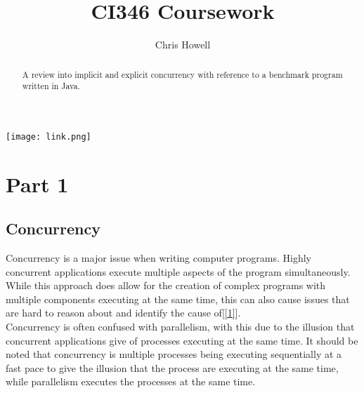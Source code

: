 \documentclass[11pt]{article}  %
\title{CI346 Coursework}
\author{Chris Howell\\}
\theoremstyle{definition}
\theoremstyle{remark}
\begin{document}
\maketitle
 \begin{center}
  \texttt{[image: link.png]}
  \end{center}
\newpage                     %
\begin{abstract}

A review into implicit and explicit concurrency with reference to a benchmark program written in Java.



\end{abstract}

\newpage                     %
\tableofcontents

\newpage                     %
\section{Part 1}\label{s:intro}
%


 \begin{center}
  \end{center}

\subsection{Concurrency}\label{ss:back}



Concurrency is a major issue when writing computer programs. Highly concurrent applications execute multiple aspects of the program simultaneously. While this approach does allow for the creation of complex programs with multiple components executing at the same time, this can also cause issues that are hard to reason about and identify the cause of[\ref{1}].\\

Concurrency is often confused with parallelism, with this due to the illusion that concurrent applications give of processes executing at the same time. It should be noted that concurrency is multiple processes being executing sequentially at a fast pace to give the illusion that the process are executing at the same time, while parallelism executes the processes at the same time.\\
\end{document}
